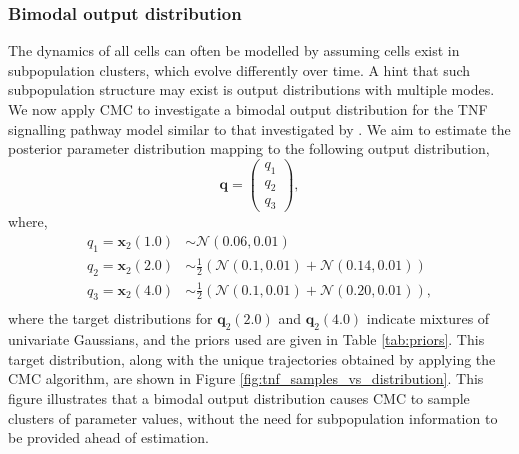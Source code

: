 \subsubsection{Bimodal output distribution}

The dynamics of all cells can often be modelled by assuming cells exist in subpopulation clusters, which evolve differently over time. A hint that such subpopulation structure may exist is output distributions with multiple modes. We now apply CMC to investigate a bimodal output distribution for the TNF signalling pathway model similar to that investigated by \cite{hasenauer2011identification}. We aim to estimate the posterior parameter distribution mapping to the following output distribution,
%
\begin{equation}
\boldsymbol{q} = \begin{pmatrix} q_1 \\ q_2 \\ q_3 \end{pmatrix},
\end{equation}
where,
\begin{equation}
\begin{aligned}
q_1 = \boldsymbol{x}_2(1.0) &\sim \mathcal{N}(0.06, 0.01)\\
q_2 = \boldsymbol{x}_2(2.0) &\sim\frac{1}{2}\left(\mathcal{N}(0.1, 0.01) + \mathcal{N}(0.14, 0.01)\right)\\
q_3 = \boldsymbol{x}_2(4.0) &\sim\frac{1}{2}\left(\mathcal{N}(0.1, 0.01) + \mathcal{N}(0.20, 0.01)\right),\\
\end{aligned}
\end{equation}
%
where the target distributions for $\boldsymbol{q}_2(2.0)$ and $\boldsymbol{q}_2(4.0)$ indicate mixtures of univariate Gaussians, and the priors used are given in Table \ref{tab:priors}. This target distribution, along with the unique trajectories obtained by applying the CMC algorithm, are shown in Figure \ref{fig:tnf_samples_vs_distribution}. This figure illustrates that a bimodal output distribution causes CMC to sample clusters of parameter values, without the need for subpopulation information to be provided ahead of estimation.

